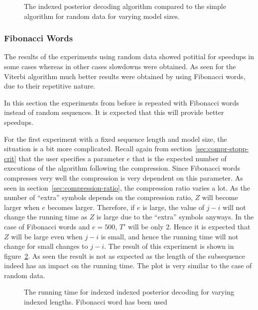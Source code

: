 \begin{figure}
  \centering
  
  \caption{The indexed posterior decoding algorithm compared to the simple
    algorithm for random data for varying model sizes.}
  \label{fig:indexed_posterior_speedup_vs_N}
\end{figure}

\subsubsection{Fibonacci Words}

The results of the experiments using random data showed potitial for speedups
in some cases whereas in other cases slowdowns were obtained. As seen for the
Viterbi algorithm much better results were obtained by using Fibonacci words,
due to their repetitive nature.

In this section the experiments from before is repeated with Fibonacci words
instead of random sequences. It is expected that this will provide better
speedups.

For the first experiment with a fixed sequence length and model size, the
situation is a bit more complicated. Recall again from
section~\ref{sec:compr-stopp-crit} that the user specifies a parameter $e$ that
is the expected number of executions of the algorithm following the
compression. Since Fibonacci words compresses very well the compression is very
dependent on this parameter. As seen in section~\ref{sec:compression-ratio},
the compression ratio varies a lot.  As the number of
``extra'' symbols depends on the compression ratio, $Z$ will become larger when
$e$ becomes larger. Therefore, if $e$ is large, the value of $j - i$ will not
change the running time as $Z$ is large due to the ``extra'' symbols anyways.
In the case of Fibonacci words and $e = 500$, $T'$ will be only 2. Hence it is
expected that $Z$ will be large even when $j - i$ is small, and hence the
running time will not change for small changes to $j - i$. The result of this
experiment is shown in
figure~\ref{fig:assymptotic_indexed_posterior_fib_subseq_length.tex}. As seen
the result is not as expected as the length of the subsequence indeed has an
impact on the running time. The plot is very similar to the case of random
data. 

\begin{figure}
  \centering
  
  \caption{The running time for indexed indexed posterior decoding for
    varying indexed lengths. Fibonacci word has been used}
  \label{fig:assymptotic_indexed_posterior_fib_subseq_length.tex}
\end{figure}

